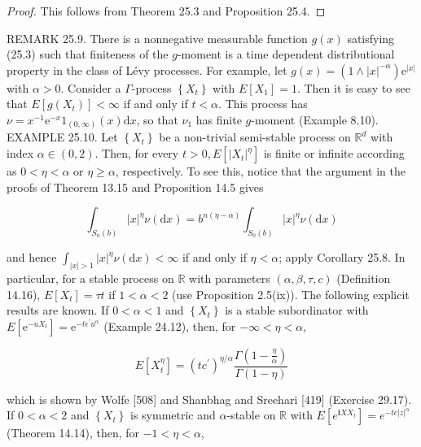 \documentclass[a4paper,11pt]{article}
\begin{document}
\begin{proof}
    This follows from Theorem 25.3 and Proposition 25.4.
\end{proof}

REMARK 25.9. There is a nonnegative measurable function $g(x)$ satisfying (25.3) such that finiteness of the $g$-moment is a
time dependent distributional property in the class of Lévy processes. For example, let $g(x)=\left(1 \wedge|x|^{-\alpha}\right)
    \mathrm{e}^{|x|}$ with $\alpha>0$. Consider a $\Gamma$-process $\left\{X_{t}\right\}$ with $E[X_{1}]=1$. Then it is easy to see
that $E\left[g\left(X_{t}\right)\right]<\infty$ if and only if $t<\alpha$. This process has
$\nu=x^{-1} \mathrm{e}^{-x} 1_{(0, \infty)}(x) \mathrm{d} x$, so that $\nu_{1}$ has finite $g$-moment (Example 8.10). \\

EXAMPLE 25.10. Let $\left\{X_{t}\right\}$ be a non-trivial semi-stable process on $\mathbb{R}^{d}$ with index
$\alpha \in(0,2)$. Then, for every $t>0, E\left[\left|X_{t}\right|^{\eta}\right]$ is finite or infinite
according as $0<\eta<\alpha$ or $\eta \geq \alpha$, respectively. To see this, notice that the argument
in the proofs of Theorem 13.15 and Proposition 14.5 gives

$$
    \int_{S_{n}(b)}|x|^{\eta} \nu(\mathrm{d} x)=b^{n(\eta-\alpha)} \int_{S_{0}(b)}|x|^{\eta} \nu(\mathrm{d} x)
$$

and hence $\int_{|x|>1}|x|^{\eta} \nu(\mathrm{d} x)<\infty$ if and only if $\eta<\alpha$; apply
Corollary 25.8. In particular, for a stable process on $\mathbb{R}$ with parameters
$(\alpha, \beta, \tau, c)$ (Definition 14.16), $E\left[X_{t}\right]=\tau t$ if
$1<\alpha<2$ (use Proposition 2.5(ix)). The following explicit results are known.
If $0<\alpha<1$ and $\left\{X_{t}\right\}$ is a stable subordinator with
$E\left[\mathrm{e}^{-u X_{t}}\right]=\mathrm{e}^{-t \epsilon^{\prime} u^{\alpha}}$ (Example 24.12),
then, for $-\infty<\eta<\alpha$,

\begin{equation*}
    E\left[X_{t}^{\eta}\right]=\left(t c^{\prime}\right)^{\eta / \alpha} \frac{\Gamma\left(1-\frac{\eta}{\alpha}\right)}{\Gamma(1-\eta)} \tag{25.5}
\end{equation*}


which is shown by Wolfe [508] and Shanbhag and Sreehari [419] (Exercise 29.17).
If $0<\alpha<2$ and $\left\{X_{t}\right\}$ is symmetric and $\alpha$-stable on $\mathbb{R}$
with $E\left[e^{\mathbf{i} X X_{t}}\right]=e^{-t c|z|^{\alpha}}$ (Theorem 14.14), then, for $-1<\eta<\alpha$,
\end{document}
